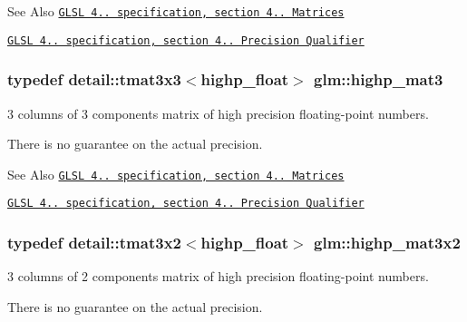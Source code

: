 \begin{DoxySeeAlso}{See Also}
\href{http://www.opengl.org/registry/doc/GLSLangSpec.4.20.8.pdf}{\tt G\-L\-S\-L 4.. specification, section 4.. Matrices} 

\href{http://www.opengl.org/registry/doc/GLSLangSpec.4.20.8.pdf}{\tt G\-L\-S\-L 4.. specification, section 4.. Precision Qualifier} 
\end{DoxySeeAlso}
\hypertarget{group__core__precision_ga28f20673ba4b1515f27a42a60900a75d}{
\subsubsection[{highp\-\_\-mat3}]{\setlength{\rightskip}{0pt plus 5cm}typedef detail\-::tmat3x3$<$highp\-\_\-float$>$ {\bf glm\-::highp\-\_\-mat3}}}\label{group__core__precision_ga28f20673ba4b1515f27a42a60900a75d}


3 columns of 3 components matrix of high precision floating-\/point numbers. 

There is no guarantee on the actual precision.

\begin{DoxySeeAlso}{See Also}
\href{http://www.opengl.org/registry/doc/GLSLangSpec.4.20.8.pdf}{\tt G\-L\-S\-L 4.. specification, section 4.. Matrices} 

\href{http://www.opengl.org/registry/doc/GLSLangSpec.4.20.8.pdf}{\tt G\-L\-S\-L 4.. specification, section 4.. Precision Qualifier} 
\end{DoxySeeAlso}
\hypertarget{group__core__precision_gae46e3b35f72ae06bc7d38ff29a189cfb}{
\subsubsection[{highp\-\_\-mat3x2}]{\setlength{\rightskip}{0pt plus 5cm}typedef detail\-::tmat3x2$<$highp\-\_\-float$>$ {\bf glm\-::highp\-\_\-mat3x2}}}\label{group__core__precision_gae46e3b35f72ae06bc7d38ff29a189cfb}


3 columns of 2 components matrix of high precision floating-\/point numbers. 

There is no guarantee on the actual precision.

